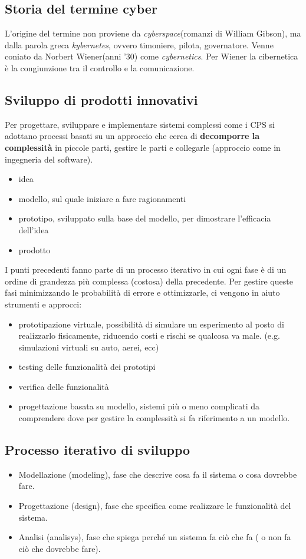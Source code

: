 \documentclass[10pt,a4paper]{article}
\begin{document}
\subsection{Storia del termine cyber}
L'origine del termine non proviene da \textit{cyberspace}(romanzi di William Gibson), ma dalla parola greca \textit{kybernetes}, ovvero timoniere, pilota, governatore. Venne coniato da Norbert Wiener(anni '30) come \textit{cybernetics}. Per Wiener la cibernetica è la congiunzione tra il controllo e la comunicazione.

\subsection{Sviluppo di prodotti innovativi}
Per progettare, sviluppare e implementare sistemi complessi come i CPS si adottano processi basati su un approccio che cerca di \textbf{decomporre la complessità} in piccole parti, gestire le parti e collegarle (approccio come in ingegneria del software).

\begin{itemize}
\item idea
\item modello, sul quale iniziare a fare ragionamenti
\item prototipo, sviluppato sulla base del modello, per dimostrare l'efficacia dell'idea
\item prodotto
\end{itemize}

I punti precedenti fanno parte di un processo iterativo in cui ogni fase è di un ordine di grandezza più complessa (costosa) della precedente.
Per gestire queste fasi minimizzando le probabilità di errore e ottimizzarle, ci vengono in aiuto strumenti e approcci:
\begin{itemize}
\item prototipazione virtuale, possibilità di simulare un esperimento al posto di realizzarlo fisicamente, riducendo costi e rischi se qualcosa va male. (e.g. simulazioni virtuali su auto, aerei, ecc)
\item testing delle funzionalità dei prototipi
\item verifica delle funzionalità
\item progettazione basata su modello, sistemi più o meno complicati da comprendere dove per gestire la complessità si fa riferimento a un modello.
\end{itemize}

\subsection{Processo iterativo di sviluppo}
\begin{itemize}
\item Modellazione (modeling), fase che descrive cosa fa il sistema o cosa dovrebbe fare.
\item Progettazione (design), fase che specifica come realizzare le funzionalità del sistema.
\item Analisi (analisys), fase che spiega perché un sistema fa ciò che fa ( o non fa ciò che dovrebbe fare).
\end{itemize}
\end{document}
